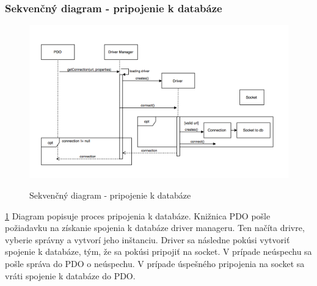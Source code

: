 \documentclass[12pt,a4paper]{article}
\begin{document}
\subsubsection{Sekvenčný diagram -  pripojenie k databáze}
\begin{figure}[H]
	\caption{Sekvenčný diagram - pripojenie k databáze}
	\includegraphics[width=\textwidth]{db}
	\label{fig:db}
\end{figure}
\ref{fig:db}
Diagram popisuje proces pripojenia k databáze. Knižnica PDO pošle požiadavku na získanie spojenia k databáze driver manageru. Ten načíta drivre, vyberie správny a vytvorí jeho inštanciu. Driver sa následne pokúsi vytvoriť spojenie k databáze, tým, že sa pokúsi pripojiť na socket. V prípade neúspechu sa pošle správa do PDO o neúspechu. V prípade úspešného pripojenia na socket sa vráti spojenie k databáze do PDO.
\end{document}
